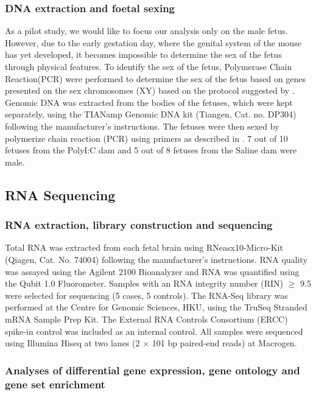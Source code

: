 \subsubsection{DNA extraction and foetal sexing}
As a pilot study, we would like to focus our analysis only on the male fetus.
However, due to the early gestation day, where the genital system of the mouse has yet developed, it becomes impossible to determine the sex of the fetus through physical features. 
To identify the sex of the fetus, Polymerase Chain Reaction(PCR) were performed to determine the sex of the fetus based on genes presented on the sex chromosomes (XY) based on the protocol suggested by \citet{Clapcote2005}. 
Genomic DNA was extracted from the bodies of the fetuses, which were kept separately, using the TIANamp Genomic DNA kit (Tiangen, Cat. no. DP304) following the manufacturer's instructions.
The fetuses were then sexed by polymerize chain reaction (PCR) using primers as described in \citet{Clapcote2005}.
 7 out of 10 fetuses from the PolyI:C dam and 5 out of 8 fetuses from the Saline dam were male.


\subsection{RNA Sequencing}
\subsubsection{RNA extraction, library construction and sequencing}
Total RNA was extracted from each fetal brain using RNeasx10-Micro-Kit (Qiagen, Cat. No. 74004) following the manufacturer’s instructions. 
RNA quality was assayed using the Agilent 2100 Bioanalyzer and RNA was quantified using the Qubit 1.0 Fluorometer. 
Samples with an RNA integrity number (RIN) $\ge$ 9.5 were selected for sequencing (5 cases, 5 controls). 
The RNA-Seq library was performed at the Centre for Genomic Sciences, HKU, using the TruSeq Stranded mRNA Sample Prep Kit. 
The External RNA Controls Consortium (ERCC) spike-in control\cite{Jiang2011} was included as an internal control. 
All samples were sequenced using Illumina Hiseq at two lanes (2 $\times$ 101 bp paired-end reads) at Macrogen.

\subsubsection{Analyses of differential gene expression, gene ontology and gene set enrichment}

